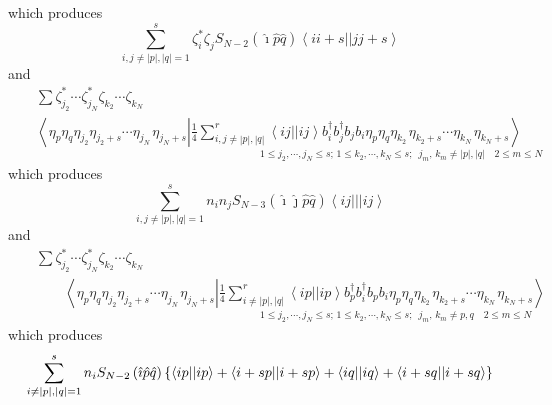 which produces 
\begin{equation}
\sum_{i,j\neq \left| p\right| ,\left| q\right| =1}^{s}\zeta _{i}^{\ast
}\zeta _{j}S_{N-2}\left( \hat{\imath}\hat{p}\hat{q}\right) \left\langle
ii+s||jj+s\right\rangle
\end{equation}%
and 
\begin{eqnarray}
&&\sum \zeta _{j_{2}}^{\ast }\cdots \zeta _{j_{N}}^{\ast }\zeta
_{k_{2}}\cdots \zeta _{k_{N}}  \nonumber \\
&&\left\langle \eta _{p}\eta _{q}\eta _{j_{2}}\eta _{j_{2}+s}\cdots \eta
_{j_{N}\,}\eta _{j_{N}+s}\left| \frac{1}{4}\sum_{i,j\neq \left| p\right|
,\left| q\right| }^{r}\left\langle ij||ij\right\rangle b_{i}^{\dagger
}b_{j}^{\dagger }b_{j}b_{i}\eta _{p}\eta _{q}\eta _{k_{2}\,}\eta
_{k_{2}+s}\cdots \eta _{k_{N}\,}\eta _{k_{N}+s}\right. \right\rangle 
\nonumber \\
&&\qquad \qquad \qquad \qquad \qquad \qquad \qquad \qquad _{1\leq
j_{2},\cdots ,j_{N}\leq s;\,1\leq k_{2},\cdots ,k_{N}\leq
s;\,\,\,j_{m},\,k_{m}\neq \left| p\right| ,\left| q\right| \quad 2\leq m\leq
N}
\end{eqnarray}%
which produces 
\begin{equation}
\sum_{i,j\neq \left| p\right| ,\left| q\right|
=1}^{s}n_{i}n_{j}S_{N-3}\left( \hat{\imath}\hat{\jmath}\hat{p}\hat{q}\right)
\left\langle ij|||ij\right\rangle
\end{equation}%
and%
\begin{eqnarray}
&&\sum \zeta _{j_{2}}^{\ast }\cdots \zeta _{j_{N}}^{\ast }\zeta
_{k_{2}}\cdots \zeta _{k_{N}}  \nonumber \\
&&\qquad \left\langle \eta _{p}\eta _{q}\eta _{j_{2}}\eta _{j_{2}+s}\cdots
\eta _{j_{N}\,}\eta _{j_{N}+s}\left| \frac{1}{4}\sum_{i\neq \left| p\right|
,\left| q\right| }^{r}\left\langle ip||ip\right\rangle b_{p}^{\dagger
}b_{i}^{\dagger }b_{p}b_{i}\eta _{p}\eta _{q}\eta _{k_{2}\,}\eta
_{k_{2}+s}\cdots \eta _{k_{N}\,}\eta _{k_{N}+s}\right. \right\rangle 
\nonumber \\
&&\qquad \qquad \qquad \qquad \qquad \qquad \qquad \qquad _{1\leq
j_{2},\cdots ,j_{N}\leq s;\,1\leq k_{2},\cdots ,k_{N}\leq
s;\,\,\,j_{m},\,k_{m}\neq p,q\quad 2\leq m\leq N}
\end{eqnarray}%
which produces 
\begin{equation}
\sum_{i\neq \left| p\right| ,\left| q\right| =1}^{s}n_{i}S_{N-2}\left( \hat{%
\imath}\hat{p}\hat{q}\right) \left\{ \left\langle ip||ip\right\rangle
+\left\langle i+sp||i+sp\right\rangle +\left\langle iq||iq\right\rangle
+\left\langle i+sq||i+sq\right\rangle \right\}
\end{equation}%
